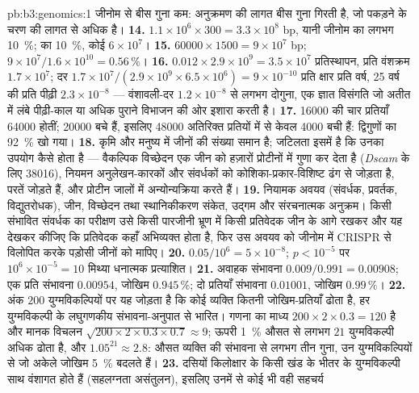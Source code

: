 \begin{solution}{pb:b3:genomics:1}
जीनोम से बीस गुना कम: अनुक्रमण की लागत बीस गुना गिरती है, जो पकड़ने के
चरण की लागत से अधिक है।
\textbf{14.} $1.1\times 10^{6}\times 300 = 3.3\times 10^{8}$ bp, यानी
जीनोम का लगभग \qty{10}{\%};  का \qty{10}{\%}, कोई $6\times
10^{7}$।
\textbf{15.} $\num{60000}\times 1500 = 9\times 10^{7}$ bp; $9\times
10^{7}/1.6\times 10^{10} = 0.56\,\%$।
\textbf{16.} $0.012\times 2.9\times 10^{9} = 3.5\times 10^{7}$
प्रतिस्थापन, प्रति वंशक्रम $1.7\times 10^{7}$; दर $1.7\times
10^{7}/(2.9\times 10^{9}\times 6.5\times 10^{6}) = 9\times 10^{-10}$
प्रति क्षार प्रति वर्ष, 25 वर्ष की प्रति पीढ़ी $2.3\times 10^{-8}$ ---
वंशावली-दर $1.2\times 10^{-8}$ से लगभग दोगुना, एक ज्ञात विसंगति जो
अतीत में लंबे पीढ़ी-काल या अधिक पुराने विभाजन की ओर इशारा करती है।
\textbf{17.} \num{16000} की चार प्रतियाँ \num{64000} होतीं;
\num{20000} बचे हैं, इसलिए \num{48000} अतिरिक्त प्रतियों में से केवल
\num{4000} बची हैं: द्विगुणों का \qty{92}{\%} खो गया।
\textbf{18.} कृमि और मनुष्य में जीनों की संख्या समान है; जटिलता इसमें
है कि उनका उपयोग कैसे होता है --- वैकल्पिक विच्छेदन एक जीन को हज़ारों
प्रोटीनों में गुणा कर देता है (\emph{Dscam} के लिए \num{38016}), नियमन
अनुलेखन-कारकों और संवर्धकों को कोशिका-प्रकार-विशिष्ट ढंग से जोड़ता है,
 परतें जोड़ते हैं, और प्रोटीन जालों में अन्योन्यक्रिया करते हैं।
\textbf{19.} नियामक अवयव (संवर्धक, प्रवर्तक, विद्युतरोधक), 
जीन, विच्छेदन तथा स्थानिकीकरण संकेत, उद्गम और संरचनात्मक अनुक्रम। किसी
संभावित संवर्धक का परीक्षण उसे किसी पारजीनी भ्रूण में किसी प्रतिवेदक
जीन के आगे रखकर और यह देखकर कीजिए कि प्रतिवेदक कहाँ अभिव्यक्त होता है,
फिर उस अवयव को जीनोम में CRISPR से विलोपित करके पड़ोसी जीनों को मापिए।
\textbf{20.} $0.05/10^{6} = 5\times 10^{-8}$; $p < 10^{-5}$ पर $10^{6}
\times 10^{-5} = 10$ मिथ्या धनात्मक प्रत्याशित।
\textbf{21.} अवाहक संभावना $0.009/0.991 = 0.00908$; एक प्रति संभावना
$0.00954$, जोखिम $0.945\,\%$; दो प्रतियाँ संभावना $0.01001$, जोखिम
$0.99\,\%$।
\textbf{22.} अंक $200$ युग्मविकल्पियों पर यह जोड़ता है कि कोई व्यक्ति
कितनी जोखिम-प्रतियाँ ढोता है, हर युग्मविकल्पी के लघुगणकीय
संभावना-अनुपात से भारित। गणना का माध्य $200\times 2\times 0.3 = 120$ है
और मानक विचलन $\sqrt{200\times 2\times 0.3\times 0.7} \approx 9$;
ऊपरी \qty{1}{\%} औसत से लगभग $21$ युग्मविकल्पी अधिक ढोता है, और
$1.05^{21} \approx
2.8$: औसत व्यक्ति की संभावना से लगभग तीन गुना, उन युग्मविकल्पियों से जो
अकेले जोखिम \qty{5}{\%} बदलते हैं।
\textbf{23.} दसियों किलोक्षार के किसी खंड के भीतर के युग्मविकल्पी साथ
वंशागत होते हैं (सहलग्नता असंतुलन), इसलिए उनमें से कोई भी वही सहचर्य

\end{solution}
